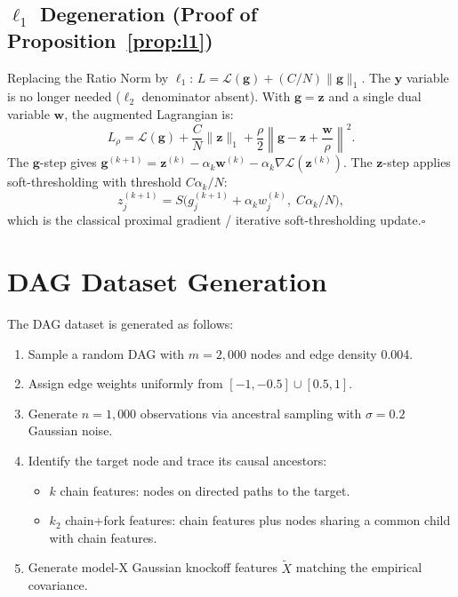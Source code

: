 \documentclass{uai2026} %
\theoremstyle{definition}
\theoremstyle{remark}
\newcommand{\bz}{\mathbf{z}}
\newcommand{\bg}{\mathbf{g}}
\newcommand{\bw}{\mathbf{w}}
\newcommand{\by}{\mathbf{y}}
\begin{document}
\subsection{$\ell_1$ Degeneration (Proof of Proposition~\ref{prop:l1})}

Replacing the Ratio Norm by $\ell_1$: $L = \mathcal{L}(\bg) + (C/N)\lVert\bg\rVert_1$.
The $\by$ variable is no longer needed ($\ell_2$ denominator absent).
With $\bg = \bz$ and a single dual variable $\bw$, the augmented Lagrangian is:
\begin{equation}
    L_\rho = \mathcal{L}(\bg) + \frac{C}{N}\lVert\bz\rVert_1
    + \frac{\rho}{2}\left\lVert\bg - \bz + \frac{\bw}{\rho}\right\rVert^2.
\end{equation}
The $\bg$-step gives $\bg^{(k+1)} = \bz^{(k)} - \alpha_k\bw^{(k)} - \alpha_k\nabla\mathcal{L}(\bz^{(k)})$.
The $\bz$-step applies soft-thresholding with threshold $C\alpha_k/N$:
\begin{equation}
    z_j^{(k+1)} = S\bigl(g_j^{(k+1)} + \alpha_k w_j^{(k)},\; C\alpha_k/N\bigr),
\end{equation}
which is the classical proximal gradient / iterative soft-thresholding update.\hfill$\square$

\section{DAG Dataset Generation}\label{app:dag}

The DAG dataset is generated as follows:
\begin{enumerate}
    \item Sample a random DAG with $m{=}2{,}000$ nodes and edge density 0.004.
    \item Assign edge weights uniformly from $[-1, -0.5] \cup [0.5, 1]$.
    \item Generate $n{=}1{,}000$ observations via ancestral sampling with $\sigma{=}0.2$ Gaussian noise.
    \item Identify the target node and trace its causal ancestors:
    \begin{itemize}
        \item $k$ chain features: nodes on directed paths to the target.
        \item $k_2$ chain+fork features: chain features plus nodes sharing a common child with chain features.
    \end{itemize}
    \item Generate model-X Gaussian knockoff features $\tilde{X}$ matching the empirical covariance.
\end{enumerate}
\end{document}
